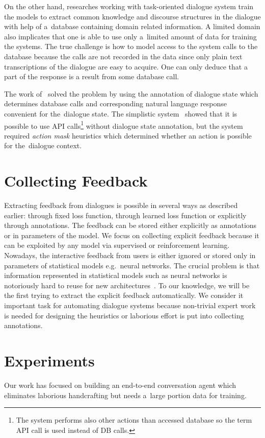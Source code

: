 \documentclass[11pt]{article}
\begin{document}
On the other hand, researches working with task-oriented dialogue system train the models to extract common knowledge and discourse structures in the dialogue with help of a~database containing domain related information.
A limited domain also implicates that one is able to use only a~limited amount of data for training the systems.
The true challenge is how to model access to the system calls to the database because the calls are not recorded in the data since only plain text transcriptions of the dialogue are easy to acquire.
One can only deduce that a part of the response is a result from some database call.

The work of~\cite{wen_networkbased_2016} solved the problem by using the annotation of dialogue state which determines database calls and corresponding natural language response convenient for the~dialogue state. 
The simplistic system~\cite{williams2016end} showed that it is possible to use API calls\footnote{The system performs also other actions than accessed database so the term API call is used instead of DB calls.} without dialogue state annotation, but the system required {\it action mask} heuristics which determined whether an action is possible for the~dialogue context.

\section{Collecting Feedback}
\label{sec:learn_feedback}
Extracting feedback from dialogues is possible in several ways as described earlier: through fixed loss function, through learned loss function or explicitly through annotations.
The feedback can be stored either explicitly as annotations or in parameters of the model.
We focus on collecting explicit feedback because it can be exploited by any model via supervised or reinforcement learning.
Nowadays, the interactive feedback from users is either ignored or stored only in parameters of statistical models e.g.\ neural networks.
The crucial problem is that information represented in statistical models such as neural networks is notoriously hard to reuse for new architectures~\cite{oquab_learning_2014}.
To our knowledge, we will be the first trying to extract the explicit feedback automatically.
We consider it important task for automating dialogue systems because non-trivial expert work is needed for designing the heuristics or laborious effort is put into collecting annotations.

\section{Experiments}\label{sec:experiments}
Our work has focused on building an end-to-end conversation agent which eliminates laborious handcrafting but needs a~large portion data for training. 
\end{document}

